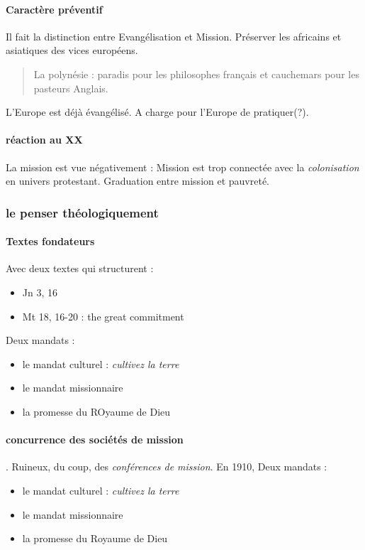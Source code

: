 \paragraph{Caractère préventif}
Il fait la distinction entre Evangélisation et Mission. Préserver les africains et asiatiques des vices européens. 
\begin{quote}
   La polynésie : paradis pour les philosophes français et cauchemars pour les pasteurs Anglais. 
\end{quote}

L'Europe est déjà évangélisé. A charge pour l'Europe de pratiquer(?). 


\paragraph{réaction au XX} La mission est vue négativement : 
Mission est trop connectée avec la \textit{colonisation} en univers protestant. Graduation entre mission et pauvreté.

\subsubsection{le penser théologiquement}
\paragraph{Textes fondateurs}
Avec deux textes qui structurent : 
\begin{itemize}
    \item Jn 3, 16
   \item Mt 18, 16-20 : the great commitment
\end{itemize}

Deux mandats :
\begin{itemize}
    \item le mandat culturel : \textit{cultivez la terre}
    \item le mandat missionnaire
    \item la promesse du ROyaume de Dieu
\end{itemize}
\paragraph{concurrence des sociétés de mission}. Ruineux, du coup, des \textit{conférences de mission}. En 1910,  
Deux mandats :
\begin{itemize}
    \item le mandat culturel : \textit{cultivez la terre}
    \item le mandat missionnaire
    \item la promesse du Royaume de Dieu
\end{itemize}
